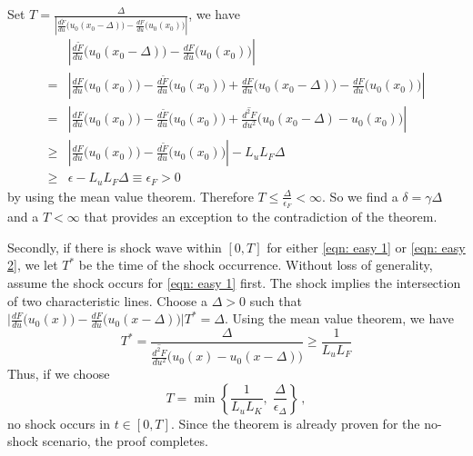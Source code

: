 Set 
$T= \frac{\Delta}{\left| \frac{d\tilde{F}}{du}\big( u_0(x_0-\Delta)\big) - \frac{dF}{du}\big( u_0(x_0) \big) \right|}$, we have
\begin{equation*}\begin{split}
     & \left| \frac{d\tilde{F}}{du}\big( u_0(x_0-\Delta)\big) - \frac{dF}{du}\big( u_0(x_0) \big) \right| \\
    = &\left| \frac{d{F}}{du}\big( u_0(x_0)\big) - \frac{d\tilde{F}}{du}\big( u_0(x_0) \big) + 
           \frac{dF}{du} \big( u_0(x_0-\Delta) \big) - \frac{dF}{du}\big( u_0(x_0)\big) \right|\\
    = &\left| \frac{d{F}}{du}\big( u_0(x_0)\big) - \frac{d\tilde{F}}{du}\big( u_0(x_0) \big) + 
       \overline{\frac{d^2 F}{du^2}} \big( u_0(x_0-\Delta) - u_0(x_0) \big) \right|\\
    \ge& \left| \frac{dF}{du}\big( u_0(x_0) \big) - \frac{d\tilde{F}}{du}\big( u_0(x_0) \big) \right| - L_uL_F \Delta \\
    \ge& \epsilon - L_uL_F\Delta\equiv \epsilon_{F} > 0
\end{split}\end{equation*}
by using the mean value theorem. Therefore $T \le \frac{\Delta}{\epsilon_F} < \infty$.
So we find a $\delta = \gamma \Delta$ and a $T < \infty$ that provides an exception
to the contradiction of the theorem. 

Secondly, if there is shock wave within $[0,T]$ for either \eqref{eqn: easy 1} or \eqref{eqn: easy 2}, we let
$T^*$ be the time of the shock occurrence. Without loss of generality, assume the shock occurs for \eqref{eqn: easy 1} first.
The shock implies the intersection of two characteristic lines. Choose a $\Delta>0$
such that $\big| \frac{dF}{du}\big(u_0(x)\big) - \frac{dF}{du} \big( u_0(x-\Delta) \big) \big|T^* = \Delta$.
Using the mean value theorem, we have
$$
    T^* = \frac{\Delta}{ \overline{\frac{d^2 F}{du^2}} \big( u_0(x) - u_0(x-\Delta) \big) } \ge \frac{1}{L_u L_F}
$$
Thus, if we choose
$$
    T = \min \left\{ 
        \frac{1}{L_uL_K},\;\frac{\Delta}{\epsilon_\Delta}
    \right\}\,,
$$
no shock occurs in $t\in[0,T]$. Since the theorem is already proven for the no-shock scenario, the proof completes.\hfill \qedsymbol


